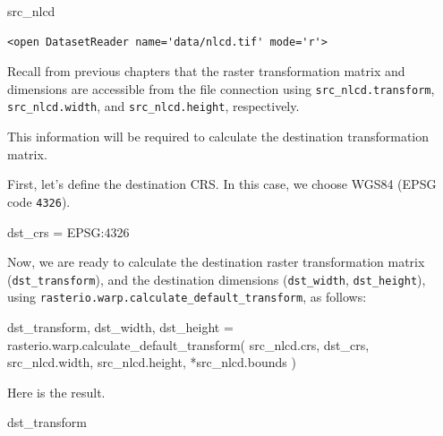 \documentclass[
  letterpaper,
]{krantz}
\newenvironment{Shaded}{\begin{snugshade}}{\end{snugshade}}
\newcommand{\NormalTok}[1]{\textcolor[rgb]{0.00,0.23,0.31}{#1}}
\newcommand{\OperatorTok}[1]{\textcolor[rgb]{0.37,0.37,0.37}{#1}}
\newcommand{\StringTok}[1]{\textcolor[rgb]{0.13,0.47,0.30}{#1}}
\begin{document}
\begin{Shaded}
\begin{Highlighting}[]
\NormalTok{src\_nlcd}
\end{Highlighting}
\end{Shaded}

\begin{verbatim}
<open DatasetReader name='data/nlcd.tif' mode='r'>
\end{verbatim}

Recall from previous chapters that the raster transformation matrix and
dimensions are accessible from the file connection using
\texttt{src\_nlcd.transform}, \texttt{src\_nlcd.width}, and
\texttt{src\_nlcd.height}, respectively.

This information will be required to calculate the destination
transformation matrix.

First, let's define the destination CRS. In this case, we choose WGS84
(EPSG code \texttt{4326}).

\begin{Shaded}
\begin{Highlighting}[]
\NormalTok{dst\_crs }\OperatorTok{=} \StringTok{\textquotesingle{}EPSG:4326\textquotesingle{}}
\end{Highlighting}
\end{Shaded}

Now, we are ready to calculate the destination raster transformation
matrix (\texttt{dst\_transform}), and the destination dimensions
(\texttt{dst\_width}, \texttt{dst\_height}), using
\texttt{rasterio.warp.calculate\_default\_transform}, as follows:

\begin{Shaded}
\begin{Highlighting}[]
\NormalTok{dst\_transform, dst\_width, dst\_height }\OperatorTok{=}\NormalTok{ rasterio.warp.calculate\_default\_transform(}
\NormalTok{    src\_nlcd.crs,}
\NormalTok{    dst\_crs,}
\NormalTok{    src\_nlcd.width,}
\NormalTok{    src\_nlcd.height,}
    \OperatorTok{*}\NormalTok{src\_nlcd.bounds}
\NormalTok{)}
\end{Highlighting}
\end{Shaded}

Here is the result.

\begin{Shaded}
\begin{Highlighting}[]
\NormalTok{dst\_transform}
\end{Highlighting}
\end{Shaded}
\end{document}
